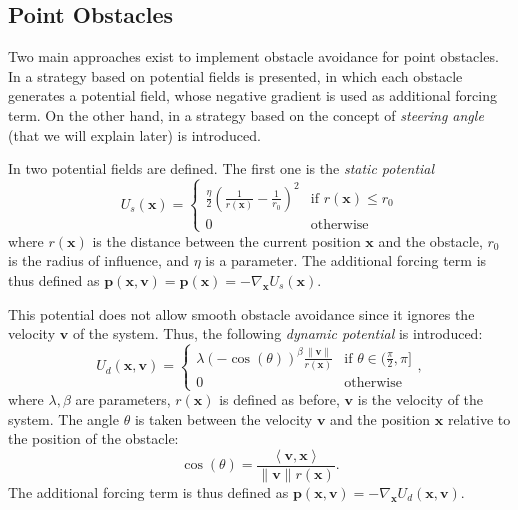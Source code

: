 \documentclass[fleqn, 11pt]{article}
\theoremstyle{definition}
\theoremstyle{plain}
\theoremstyle{remark}
\begin{document}
\subsection{Point Obstacles}

Two main approaches exist to implement obstacle avoidance for point obstacles.
In \cite{PHPS08} a strategy based on potential fields is presented, in which each obstacle generates a potential field, whose negative gradient is used as additional forcing term.
On the other hand, in \cite{HPPS09} a strategy based on the concept of \emph{steering angle} (that we will explain later) is introduced.

In \cite{PHPS08} two potential fields are defined.
The first one is the \emph{static potential}
\begin{equation}
    U_s (\mathbf{x}) =
    \begin{cases}
        \frac{\eta}{2} \left( { \frac{1}{ r(\mathbf{x}) } - \frac{1}{r_0} }  \right) ^ 2   & \text {if } r (\mathbf{x}) \le r_0 \\
        0                                                                   & \text{otherwise}
    \end{cases}
\end{equation}
where $ r(\mathbf{x}) $ is the distance between the current position $\mathbf{x}$ and the obstacle, $ r_0 $ is the radius of influence, and $\eta$ is a parameter.
The additional forcing term is thus defined as \( \mathbf{p} (\mathbf{x}, \mathbf{v}) = \mathbf{p}(\mathbf{x}) = - \nabla_{\mathbf{x}} U_s (\mathbf{x}) \).

This potential does not allow smooth obstacle avoidance since it ignores the velocity $ \mathbf{v} $ of the system.
Thus, the following \emph{dynamic potential} is introduced:
\begin{equation}
    U_d (\mathbf{x}, \mathbf{v}) =
    \begin{cases}
        \lambda (- \cos( \theta ))^\beta \frac{ \|{\mathbf{v}}\|}{r (\mathbf{x}) }   & \text {if } \theta \in ( \frac{\pi}{2} , \pi] \\
        0                                                                   & \text{otherwise}
    \end{cases},
\end{equation}
where $ \lambda, \beta $ are parameters, $ r (\mathbf{x}) $ is defined as before, $ \mathbf{v} $ is the velocity of the system.
The angle $ \theta $ is taken between the velocity $\mathbf{v}$ and the position $\mathbf{x}$ relative to the position of the obstacle:
\[ \cos (\theta) = \frac{ \left\langle  {\mathbf{v}},{\mathbf{x}}   \right\rangle}{ \| { \mathbf{v} } \| r(\mathbf{x}) }. \]
The additional forcing term is thus defined as \( \mathbf{p} (\mathbf{x}, \mathbf{v}) = - \nabla_{\mathbf{x}} U_d (\mathbf{x} , \mathbf{v}) \).
\end{document}
